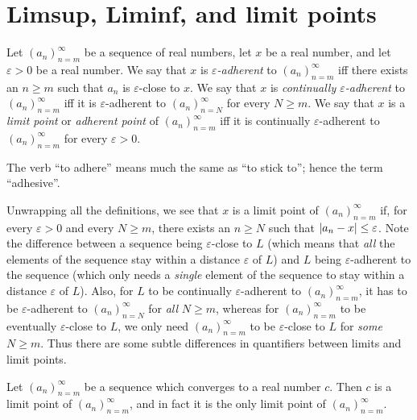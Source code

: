 \section{Limsup, Liminf, and limit points}\label{sec:6.4}

\begin{defn}\label{6.4.1}
  Let \((a_n)_{n = m}^\infty\) be a sequence of real numbers, let \(x\) be a real number, and let \(\varepsilon > 0\) be a real number.
  We say that \(x\) is \emph{\(\varepsilon\)-adherent} to \((a_n)_{n = m}^\infty\) iff there exists an \(n \geq m\) such that \(a_n\) is \(\varepsilon\)-close to \(x\).
  We say that \(x\) is \emph{continually \(\varepsilon\)-adherent} to \((a_n)_{n = m}^\infty\) iff it is \(\varepsilon\)-adherent to \((a_n)_{n = N}^\infty\) for every \(N \geq m\).
  We say that \(x\) is a \emph{limit point} or \emph{adherent point} of \((a_n)_{n = m}^\infty\) iff it is continually \(\varepsilon\)-adherent to \((a_n)_{n = m}^\infty\) for every \(\varepsilon > 0\).
\end{defn}

\begin{rmk}\label{6.4.2}
  The verb ``to adhere'' means much the same as ``to stick to'';
  hence the term ``adhesive''.
\end{rmk}

\begin{note}
  Unwrapping all the definitions, we see that \(x\) is a limit point of \((a_n)_{n = m}^\infty\) if, for every \(\varepsilon > 0\) and every \(N \geq m\), there exists an \(n \geq N\) such that \(\left\lvert a_n - x\right\rvert \leq \varepsilon\).
  Note the difference between a sequence being \(\varepsilon\)-close to \(L\)
  (which means that \emph{all} the elements of the sequence stay within a distance \(\varepsilon\) of \(L\))
  and \(L\) being \(\varepsilon\)-adherent to the sequence
  (which only needs a \emph{single} element of the sequence to stay within a distance \(\varepsilon\) of \(L\)).
  Also, for \(L\) to be continually \(\varepsilon\)-adherent to \((a_n)_{n = m}^\infty\), it has to be \(\varepsilon\)-adherent to \((a_n)_{n = N}^\infty\) for \emph{all} \(N \geq m\), whereas for \((a_n)_{n = m}^\infty\) to be eventually \(\varepsilon\)-close to \(L\), we only need \((a_n)_{n = m}^\infty\) to be \(\varepsilon\)-close to \(L\) for \emph{some} \(N \geq m\).
  Thus there are some subtle differences in quantifiers between limits and limit points.
\end{note}

\setcounter{thm}{4}
\begin{prop}\label{6.4.5}
  Let \((a_n)_{n = m}^\infty\) be a sequence which converges to a real number \(c\).
  Then \(c\) is a limit point of \((a_n)_{n = m}^\infty\), and in fact it is the only limit point of \((a_n)_{n = m}^\infty\).
\end{prop}

